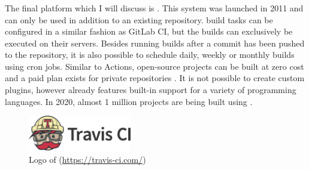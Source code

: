 
\subsubsection{\travisci}\label{sssec:travisci}
The final \CI{} platform which I will discuss is \travisci{}. This \CI{} system was launched in 2011 and can only be used in addition to an existing \github{} repository. \travisci{} build tasks can be configured in a similar fashion as GitLab CI, but the builds can exclusively be executed on their servers. Besides running builds after a commit has been pushed to the repository, it is also possible to schedule daily, weekly or monthly builds using cron jobs. Similar to \github{} Actions, open-source projects can be built at zero cost and a paid plan exists for private repositories \cite{travisanalysis}. It is not possible to create custom plugins, however \travisci{} already features built-in support for a variety of programming languages. In 2020, almost 1 million projects are being built using \travisci{} \cite{travis2020}.

\begin{figure}[htbp!]
	\centering
	\includegraphics[width=0.40\textwidth]{assets/images/travis-ci.pdf}
	\caption{Logo of \travisci{} (\url{https://travis-ci.com/})}
	\label{fig:travis-ci}
\end{figure}
